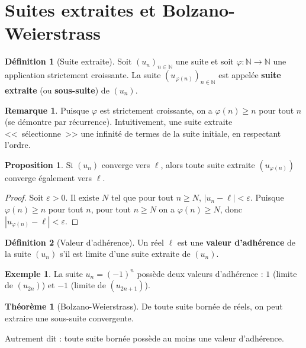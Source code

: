 \documentclass[12pt,a4paper,openany]{book}
\theoremstyle{definition}
\newtheorem{definition}{Définition}[chapter]
\newtheorem{theoreme}{Théorème}[chapter]
\newtheorem{proposition}{Proposition}[chapter]
\newtheorem{remarque}{Remarque}[chapter]
\newtheorem{exemple}{Exemple}[chapter]
\newcommand{\N}{\mathbb{N}}
\newcommand{\eps}{\varepsilon}
\newcommand{\abs}[1]{\left\lvert #1 \right\rvert}
\begin{document}
\section{Suites extraites et Bolzano-Weierstrass}\label{sec:suites:extraites}

\begin{definition}[Suite extraite]\label{def:suite-extraite}
  Soit $(u_n)_{n \in \N}$ une suite et soit $\varphi : \N \to \N$ une application
  strictement croissante. La suite $(u_{\varphi(n)})_{n \in \N}$ est appelée
  \textbf{suite extraite} (ou \textbf{sous-suite}) de $(u_n)$.
\end{definition}

\begin{remarque}
  Puisque $\varphi$ est strictement croissante, on a $\varphi(n) \geq n$ pour tout $n$
  (se démontre par récurrence). Intuitivement, une suite extraite <<~sélectionne~>>
  une infinité de termes de la suite initiale, en respectant l'ordre.
\end{remarque}

\begin{proposition}\label{prop:sous-suite-cv}
  Si $(u_n)$ converge vers $\ell$, alors toute suite extraite $(u_{\varphi(n)})$
  converge également vers $\ell$.
\end{proposition}

\begin{proof}
  Soit $\eps > 0$. Il existe $N$ tel que pour tout $n \geq N$, $\abs{u_n - \ell} < \eps$.
  Puisque $\varphi(n) \geq n$ pour tout $n$, pour tout $n \geq N$ on a $\varphi(n) \geq N$,
  donc $\abs{u_{\varphi(n)} - \ell} < \eps$.
\end{proof}

\begin{definition}[Valeur d'adhérence]\label{def:valeur-adherence}
  Un réel $\ell$ est une \textbf{valeur d'adhérence} de la suite $(u_n)$ s'il est limite
  d'une suite extraite de $(u_n)$.
\end{definition}

\begin{exemple}
  La suite $u_n = (-1)^n$ possède deux valeurs d'adhérence : $1$ (limite de $(u_{2n})$)
  et $-1$ (limite de $(u_{2n+1})$).
\end{exemple}

\begin{theoreme}[Bolzano-Weierstrass]\label{thm:bolzano-weierstrass}
  De toute suite bornée de réels, on peut extraire une sous-suite convergente.

  Autrement dit : toute suite bornée possède au moins une valeur d'adhérence.
\end{theoreme}
\end{document}
